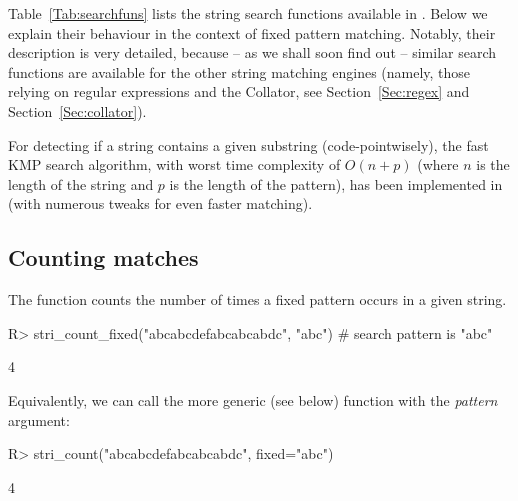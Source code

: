 \documentclass[nojss]{jss}\usepackage[]{graphicx}\usepackage[]{color}
\begin{document}
Table~\ref{Tab:searchfuns} lists the string search functions available
in . Below we explain their behaviour in the context of fixed
pattern matching. Notably, their description
is very detailed, because -- as we shall soon find out --
similar search functions are available for the other string matching
engines (namely, those relying on  regular expressions
and the  Collator,
see Section~\ref{Sec:regex} and Section~\ref{Sec:collator}).


For detecting if a string contains
a given substring  (code-pointwisely),  the fast KMP \citep{KnuthETAL1977:kmp}
search algorithm, with worst time complexity of $O(n+p)$
(where $n$ is the length of the string and $p$ is the length of the pattern),
has been implemented in  (with numerous tweaks
for even faster matching).



\subsection{Counting matches}

The  function counts the number of
times a fixed pattern occurs in a given string.

\begin{Schunk}
\begin{Sinput}
R> stri_count_fixed("abcabcdefabcabcabdc", "abc")  # search pattern is "abc"
\end{Sinput}
\begin{Soutput}
[1] 4
\end{Soutput}
\end{Schunk}

Equivalently, we can call the more generic (see below)
function  with  the \textit{pattern} argument:

\begin{Schunk}
\begin{Sinput}
R> stri_count("abcabcdefabcabcabdc", fixed="abc")
\end{Sinput}
\begin{Soutput}
[1] 4
\end{Soutput}
\end{Schunk}
\end{document}
